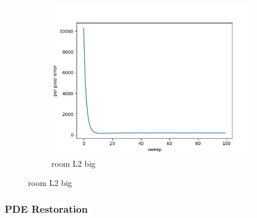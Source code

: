 \documentclass[11pt]{article}
\begin{document}
\begin{figure}[ht!]
\begin{subfigure}[]{0.333\linewidth}
        \includegraphics[width=\linewidth]{fig/loss/room_L2_big_loss.jpg}
        \caption{room L2 big}
    \end{subfigure}%
\end{figure}

\subsubsection{PDE Restoration}
\end{document}
